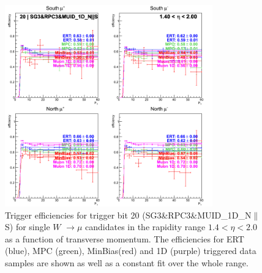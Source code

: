 \begin{figure}[h!]

  \centering

  \includegraphics[width=0.8\textwidth]{./figures/run13_trigeffipt_eta1_trig20_lin.png}
  \caption{\label{fig:run13_trigeffipt_eta1_nper0_trig20_lin} Trigger efficiencies for trigger bit 20 (SG3\&RPC3\&MUID\_1D\_N$\|$S) for single $W$ $\rightarrow \mu$ candidates in the rapidity range $ 1.4 < \eta < 2.0$ as a function of transverse momentum. The efficiencies for ERT (blue), MPC (green), MinBias(red) and 1D (purple) triggered data samples are shown as well as a constant fit over the whole range.}

\end{figure}
\clearpage
